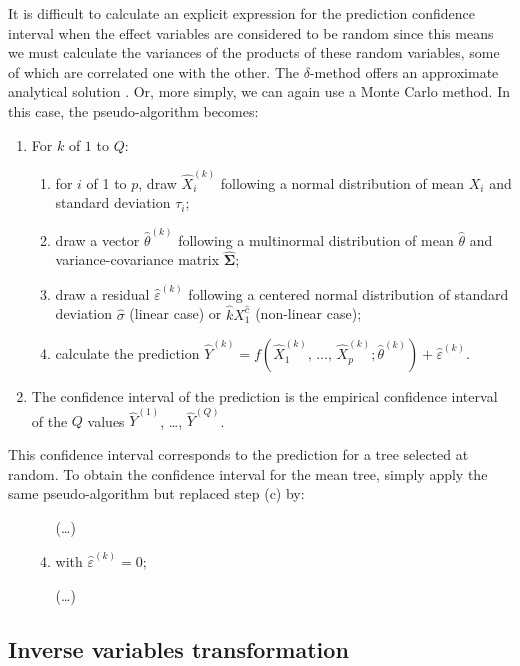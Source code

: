 It is difficult to calculate an explicit expression for the prediction confidence interval when the effect variables are considered to be random since this means we must calculate the variances of the products of these random variables, some of which are correlated one with the other. The $\delta$-method offers an approximate analytical solution \citep{serfling80}. Or, more simply, we can again use a Monte Carlo method. In this case, the pseudo-algorithm becomes:\label{psa}
\begin{enumerate}
\item For $k$ of $1$ to $Q$:
    \begin{enumerate}
    \item for $i$ of 1 to $p$, draw $\hat{X}_i^{(k)}$ following a normal distribution of mean $X_i$ and standard deviation  $\tau_i$;
    \item draw a vector $\hat{\theta}^{(k)}$ following a multinormal distribution of mean $\hat{\theta}$ and variance-covariance matrix $\hat{\boldsymbol{\Sigma}}$;
    \item draw a residual $\hat{\varepsilon}^{(k)}$ following a centered normal distribution of standard deviation $\hat{\sigma}$ (linear case) or 
    $\hat{k}X_1^{\hat{c}}$ (non-linear case);
    \item calculate the prediction 
    $\hat{Y}^{(k)}=f(\hat{X}_1^{(k)},\,\ldots,\,\hat{X}_p^{(k)};
    \hat{\theta}^{(k)})+\hat{\varepsilon}^{(k)}$.
    \end{enumerate}
\item The confidence interval of the prediction is the empirical confidence interval of the $Q$ values $\hat{Y}^{(1)}$, \ldots,
$\hat{Y}^{(Q)}$.
\end{enumerate}
This confidence interval corresponds to the prediction for a tree selected at random. To obtain the confidence interval for the mean tree, simply apply the same pseudo-algorithm but replaced step (c) by:
\begin{enumerate}
\item[]
    \begin{enumerate}\setcounter{enumii}{2}
    \item[(\ldots)]
    \item with $\hat{\varepsilon}^{(k)}=0$;
    \item[(\ldots)]
    \end{enumerate}
\end{enumerate}

\subsection{Inverse variables transformation\label{invtra}}

